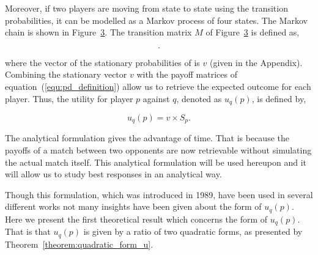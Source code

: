 \documentclass[10pt]{article}
\begin{document}
\begin{figure}
    \centering
    \begin{subfigure}{0.45\textwidth}
        \centering
        
        \label{fig:diagram_mem_one}
    \end{subfigure}
    \begin{subfigure}{0.45\textwidth}
        \centering
        
        \label{fig:markov_chain}
    \end{subfigure}
\end{figure}

Moreover, if two players are moving from state to state using the transition
probabilities, it can be modelled as a Markov process of four states. The Markov 
chain is shown in Figure~\ref{fig:markov_chain}. The transition matrix \(M\) of
Figure~\ref{fig:markov_chain} is defined as,

\begin{equation}\label{eq:m_matrix}
    .
\end{equation}

where the vector of the stationary probabilities of is \(v\) (given in the Appendix). %
Combining the stationary vector \(v\) with the payoff matrices of equation~(\ref{equ:pd_definition})
allow us to retrieve the expected outcome for each player. Thus, the utility for
player \(p\) against \(q\), denoted as \(u_q(p)\), is defined by,

\begin{equation}\label{eq:press_dyson_utility}
    u_q(p) = v \times S_p.
\end{equation}

The analytical formulation gives the advantage of time. That is because the 
payoffs of a match between two opponents are now retrievable without 
simulating the actual match itself. This analytical formulation will be used
hereupon and it will allow us to study best responses in an analytical way.

Though this formulation, which was introduced in 1989, have been
used in several different works not many insights have been given about the form of \(u_q(p)\).
Here we present the first theoretical result which concerns the form of \(u_q(p)\).
That is that \(u_q(p)\) is given by a ratio of two quadratic forms, as presented
by Theorem~\ref{theorem:quadratic_form_u}.
\end{document}
